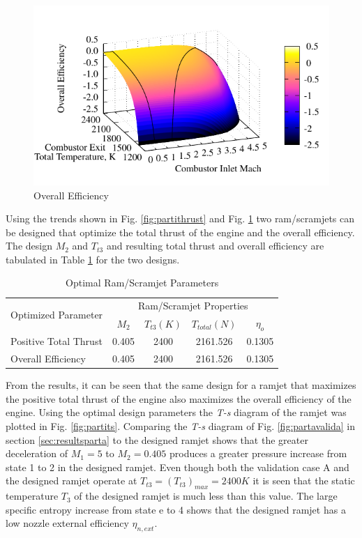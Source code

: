 \documentclass[conf]{new-aiaa} %
\begin{document}
\begin{figure}[H] %
    \centering
    \includegraphics[]{media/propulsion_design_files/eta_o_plot.pdf}
    \caption{\label{fig:partietao}Overall Efficiency}
\end{figure}
Using the trends shown in Fig. \ref{fig:partithrust} and Fig. \ref{fig:partietao} two ram/scramjets can be designed that optimize the total thrust of the engine and the overall efficiency. The design $M_2$ and $T_{t3}$ and resulting total thrust and overall efficiency are tabulated in Table \ref{tab:design_propsys} for the two designs.

\begin{table}[H] %
    \caption{\label{tab:design_propsys}Optimal Ram/Scramjet Parameters}
    \centering
    \begin{tabular}{lcccc}
        \hline
            \multirow{2}{*}{Optimized Parameter}& \multicolumn{4}{c}{Ram/Scramjet Properties}\\
            & $M_2$& $T_{t3}(K)$& $T_{total}(N)$& $\eta_o$\\\hline
            Positive Total Thrust& 0.405& 2400& 2161.526& 0.1305\\
            Overall Efficiency& 0.405& 2400& 2161.526& 0.1305\\
        \hline
    \end{tabular}
\end{table}
From the results, it can be seen that the same design for a ramjet that maximizes the positive total thrust of the engine also maximizes the overall efficiency of the engine. Using the optimal design parameters the \textit{T-s} diagram of the ramjet was plotted in Fig. \ref{fig:partits}. Comparing the \textit{T-s} diagram of Fig. \ref{fig:partavalida} in section \ref{sec:resultsparta} to the designed ramjet shows that the greater deceleration of $M_1=5$ to $M_2=0.405$ produces a greater pressure increase from state 1 to 2 in the designed ramjet. Even though both the validation case A and the designed ramjet operate at $T_{t3}=(T_{t3})_{max}=2400K$ it is seen that the static temperature $T_3$ of the designed ramjet is much less than this value. The large specific entropy increase from state e to 4 shows that the designed ramjet has a low nozzle external efficiency $\eta_{n,ext}$.
\end{document}
